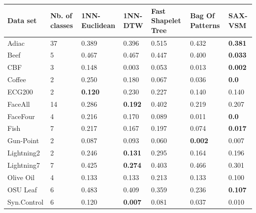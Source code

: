 \begin{footnotesize}
\begin{table}[t]
\begin{tabularx}{\linewidth}{@{} l *6X @{}}
Data set & Nb. of classes & 1NN-Euclidean & 1NN-DTW & Fast Shapelet Tree &  Bag Of \mbox{Patterns}
& SAX-VSM\\\midrule
Adiac             &37  & 0.389   & 0.396           & 0.515        & 0.432         & \textbf{0.381}\\
Beef              &5   & 0.467   & 0.467           & 0.447        & 0.400         & \textbf{0.033}\\
CBF             & 3   & 0.148    & 0.003     & 0.053    & 0.013 & \textbf{0.002} \\
Coffee           &2    & 0.250   & 0.180           & 0.067     & 0.036     & \textbf{0.0} \\
ECG200          &2   & \textbf{ 0.120 }  & 0.230           & 0.227     & 0.140   & 0.140 \\
FaceAll        &14     & 0.286   & \textbf{0.192}  & 0.402     & 0.219   & 0.207\\
FaceFour        &4     & 0.216   & 0.170           & 0.089     & 0.011   & \textbf{0.0} \\
Fish               &7   & 0.217   & 0.167           & 0.197    & 0.074   & \textbf{0.017} \\
Gun-Point      &2      & 0.087   & 0.093           & 0.060     & \textbf{0.002}     & 0.007 \\
Lightning2     &2      & 0.246   & \textbf{0.131}  & 0.295     & 0.164            & 0.196 \\
Lightning7     &7      & 0.425   & \textbf{0.274}  & 0.403     & 0.466            & 0.301 \\
Olive Oil      &4   & 0.133   & 0.133  & 0.213     & 0.133            & 0.100\\
OSU Leaf      &6   & 0.483   & 0.409  & 0.359     & 0.236            & \textbf{0.107} \\
Syn.Control  &6   & 0.120   & \textbf{0.007}  & 0.081     & 0.037            & 0.010 \\

\end{tabularx}
\end{table}
\end{footnotesize}
